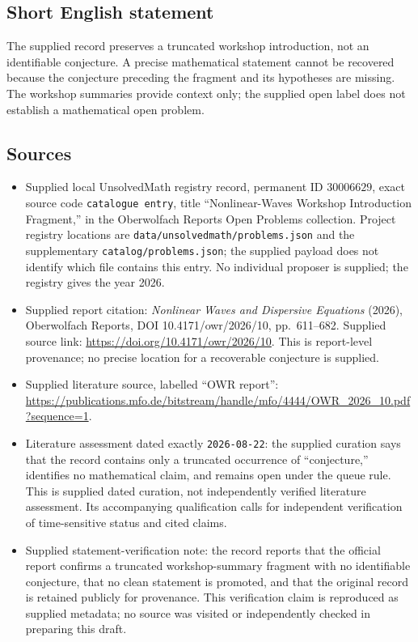 \documentclass[11pt]{article}
\begin{document}
\subsection{Short English statement}
The supplied record preserves a truncated workshop introduction, not an identifiable conjecture. A precise mathematical statement cannot be recovered because the conjecture preceding the fragment and its hypotheses are missing. The workshop summaries provide context only; the supplied open label does not establish a mathematical open problem.
\subsection{Sources}
\begin{itemize}
\item Supplied local UnsolvedMath registry record, permanent ID \(30006629\), exact source code \texttt{catalogue entry}, title ``Nonlinear-Waves Workshop Introduction Fragment,'' in the Oberwolfach Reports Open Problems collection. Project registry locations are \texttt{data/unsolvedmath/problems.json} and the supplementary \texttt{catalog/problems.json}; the supplied payload does not identify which file contains this entry. No individual proposer is supplied; the registry gives the year 2026.
\item Supplied report citation: \emph{Nonlinear Waves and Dispersive Equations} (2026), Oberwolfach Reports, DOI 10.4171/owr/2026/10, pp.~611--682. Supplied source link: \url{https://doi.org/10.4171/owr/2026/10}. This is report-level provenance; no precise location for a recoverable conjecture is supplied.
\item Supplied literature source, labelled ``OWR report'': \url{https://publications.mfo.de/bitstream/handle/mfo/4444/OWR_2026_10.pdf?sequence=1}.
\item Literature assessment dated exactly \texttt{2026-08-22}: the supplied curation says that the record contains only a truncated occurrence of ``conjecture,'' identifies no mathematical claim, and remains open under the queue rule. This is supplied dated curation, not independently verified literature assessment. Its accompanying qualification calls for independent verification of time-sensitive status and cited claims.
\item Supplied statement-verification note: the record reports that the official report confirms a truncated workshop-summary fragment with no identifiable conjecture, that no clean statement is promoted, and that the original record is retained publicly for provenance. This verification claim is reproduced as supplied metadata; no source was visited or independently checked in preparing this draft.
\end{itemize}
\end{document}
